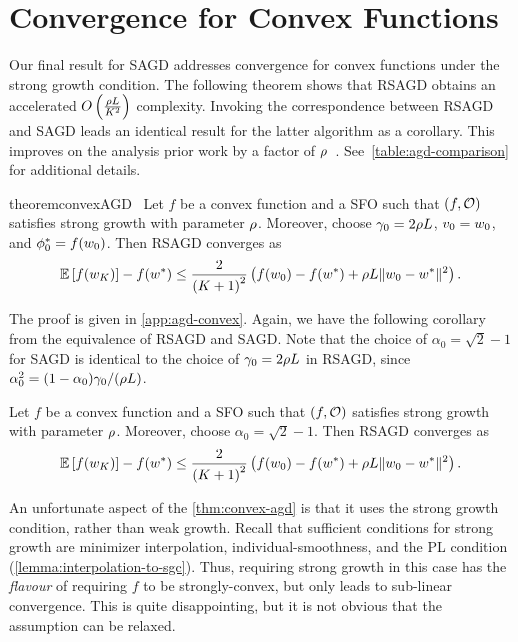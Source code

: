 \section{Convergence for Convex Functions}\label{sec:agd-convex}

Our final result for \ac{SAGD} addresses convergence for convex functions under the strong growth condition. 
The following theorem shows that \ac{RSAGD} obtains an accelerated \( O\rbr{\frac{\sgc L}{K^2}} \) complexity.
Invoking the correspondence between \ac{RSAGD} and \ac{SAGD} leads an identical result for the latter algorithm as a corollary.
This improves on the analysis prior work by a factor of \( \sgc \)~\citep[Theorem 2]{vaswani2019fast}. 
See~\autoref{table:agd-comparison} for additional details.

\begin{restatable}{theorem}{convexAGD}~\label{thm:convex-agd}
    Let \( f \) be a convex function and \oracle{} a \ac{SFO} such that \( \rbr{f, \oracle{}} \) satisfies strong growth with parameter \( \sgc \).
    Moreover, choose \( \gamma_0 = 2 \sgc L \), \( v_0 = \w_0 \), and \( \phi_0^* = f(\w_0) \).
    Then \ac{RSAGD} converges as  
    \[ \E\sbr{f(\w_K)} - f(\wopt) \leq \frac{2}{\rbr{K+1}^2}\rbr{f(\w_0) - f(\wopt) + \sgc L \norm{\w_0 - \wopt}^2 }. \]
\end{restatable}

\noindent The proof is given in \autoref{app:agd-convex}.
Again, we have the following corollary from the equivalence of \ac{RSAGD} and \ac{SAGD}. 
Note that the choice of \( \alpha_0 = \sqrt{2} - 1 \) for \ac{SAGD} is identical to the choice of \( \gamma_0 = 2 \sgc L \) in \ac{RSAGD}, since \( \alpha_0^2 = (1 - \alpha_0) \gamma_0 / (\sgc L) \).

\begin{corollary}
    Let \( f \) be a convex function and \oracle{} a \ac{SFO} such that \( \rbr{f, \oracle{}} \) satisfies strong growth with parameter \( \sgc \).
    Moreover, choose \( \alpha_0 = \sqrt{2} - 1 \).
    Then \ac{RSAGD} converges as  
    \[ \E\sbr{f(\w_K)} - f(\wopt) \leq \frac{2}{\rbr{K+1}^2}\rbr{f(\w_0) - f(\wopt) + \sgc L \norm{\w_0 - \wopt}^2 }. \]
\end{corollary}

 An unfortunate aspect of the \autoref{thm:convex-agd} is that it uses the strong growth condition, rather than weak growth.
 Recall that sufficient conditions for strong growth are minimizer interpolation, individual-smoothness, and the PL condition (\autoref{lemma:interpolation-to-sgc}). 
 Thus, requiring strong growth in this case has the \emph{flavour} of requiring \( f \) to be strongly-convex, but only leads to sub-linear convergence.
This is quite disappointing, but it is not obvious that the assumption can be relaxed.

